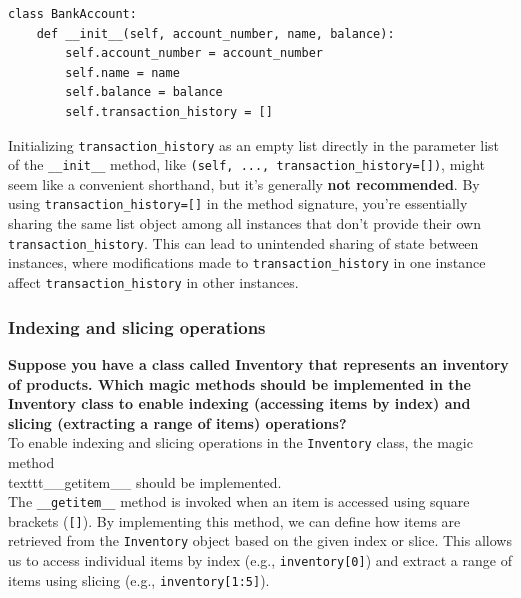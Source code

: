 \begin{codebox}
\begin{verbatim}
class BankAccount:
    def __init__(self, account_number, name, balance):
        self.account_number = account_number
        self.name = name
        self.balance = balance
        self.transaction_history = []
\end{verbatim}
\end{codebox}

Initializing \texttt{transaction\_history} as an empty list directly in the parameter list of the \texttt{\_\_init\_\_} method, like \texttt{(self, ..., transaction\_history=[])}, might seem like a convenient shorthand, but it's generally \textbf{not recommended}. By using \texttt{transaction\_history=[]} in the method signature, you're essentially sharing the same list object among all instances that don't provide their own \texttt{transaction\_history}. This can lead to unintended sharing of state between instances, where modifications made to \texttt{transaction\_history} in one instance affect \texttt{transaction\_history} in other instances.

\subsubsection{Indexing and slicing operations}
\textbf{Suppose you have a class called Inventory that represents an inventory of products. Which magic methods should be implemented in the Inventory class to enable indexing (accessing items by index) and slicing (extracting a range of items) operations?}\\

To enable indexing and slicing operations in the \texttt{Inventory} class, the magic method \\texttt{\_\_getitem\_\_} should be implemented.\\

The \texttt{\_\_getitem\_\_} method is invoked when an item is accessed using square brackets (\texttt{[]}). By implementing this method, we can define how items are retrieved from the \texttt{Inventory} object based on the given index or slice. This allows us to access individual items by index (e.g., \texttt{inventory[0]}) and extract a range of items using slicing (e.g., \texttt{inventory[1:5]}).

\newpage
